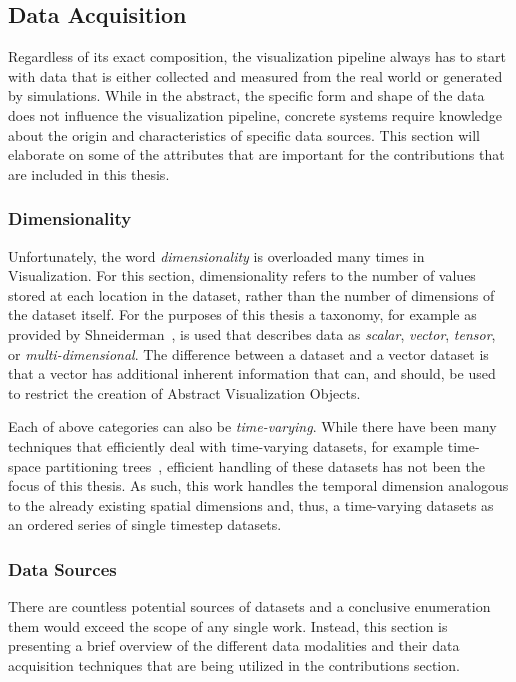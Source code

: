 \subsection{Data Acquisition} \label{cha:intro:vp:da}
Regardless of its exact composition, the visualization pipeline always has to start with data that is either collected and measured from the real world or generated by simulations.  While in the abstract, the specific form and shape of the data does not influence the visualization pipeline, concrete systems require knowledge about the origin and characteristics of specific data sources.  This section will elaborate on some of the attributes that are important for the contributions that are included in this thesis.

\subsubsection{Dimensionality} \label{cha:intro:vp:da:dimensionality}
Unfortunately, the word \emph{dimensionality} is overloaded many times in Visualization.  For this section, dimensionality refers to the number of values stored at each location in the dataset, rather than the number of dimensions of the dataset itself.  For the purposes of this thesis a taxonomy, for example as provided by Shneiderman~\cite{shneiderman1996eyes}, is used that describes data as \emph{scalar}, \emph{vector}, \emph{tensor}, or \emph{multi-dimensional}.  The difference between a  dataset and a vector dataset is that a vector has additional inherent information that can, and should, be used to restrict the creation of Abstract Visualization Objects.

Each of above categories can also be \emph{time-varying}.  While there have been many techniques that efficiently deal with time-varying datasets, for example time-space partitioning trees~\cite{shen1999fast}, efficient handling of these datasets has not been the focus of this thesis.  As such, this work handles the temporal dimension analogous to the already existing spatial dimensions and, thus, a time-varying datasets as an ordered series of single timestep datasets.

\subsubsection{Data Sources} \label{cha:intro:vp:da:sources}
There are countless potential sources of datasets and a conclusive enumeration them would exceed the scope of any single work.  Instead, this section is presenting a brief overview of the different data modalities and their data acquisition techniques that are being utilized in the contributions section.

